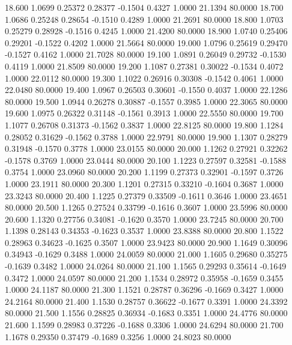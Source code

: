   18.600   1.0699   0.25372   0.28377  -0.1504   0.4327   1.0000  21.1394  80.0000
  18.700   1.0686   0.25248   0.28654  -0.1510   0.4289   1.0000  21.2691  80.0000
  18.800   1.0703   0.25279   0.28928  -0.1516   0.4245   1.0000  21.4200  80.0000
  18.900   1.0740   0.25406   0.29201  -0.1522   0.4202   1.0000  21.5664  80.0000
  19.000   1.0796   0.25619   0.29470  -0.1527   0.4162   1.0000  21.7028  80.0000
  19.100   1.0891   0.26049   0.29732  -0.1530   0.4119   1.0000  21.8509  80.0000
  19.200   1.1087   0.27381   0.30022  -0.1534   0.4072   1.0000  22.0112  80.0000
  19.300   1.1022   0.26916   0.30308  -0.1542   0.4061   1.0000  22.0480  80.0000
  19.400   1.0967   0.26503   0.30601  -0.1550   0.4037   1.0000  22.1286  80.0000
  19.500   1.0944   0.26278   0.30887  -0.1557   0.3985   1.0000  22.3065  80.0000
  19.600   1.0975   0.26322   0.31148  -0.1561   0.3913   1.0000  22.5550  80.0000
  19.700   1.1077   0.26708   0.31373  -0.1562   0.3837   1.0000  22.8125  80.0000
  19.800   1.1284   0.28052   0.31629  -0.1562   0.3788   1.0000  22.9791  80.0000
  19.900   1.1307   0.28279   0.31948  -0.1570   0.3778   1.0000  23.0155  80.0000
  20.000   1.1262   0.27921   0.32262  -0.1578   0.3769   1.0000  23.0444  80.0000
  20.100   1.1223   0.27597   0.32581  -0.1588   0.3754   1.0000  23.0960  80.0000
  20.200   1.1199   0.27373   0.32901  -0.1597   0.3726   1.0000  23.1911  80.0000
  20.300   1.1201   0.27315   0.33210  -0.1604   0.3687   1.0000  23.3243  80.0000
  20.400   1.1225   0.27379   0.33509  -0.1611   0.3646   1.0000  23.4651  80.0000
  20.500   1.1265   0.27524   0.33799  -0.1616   0.3607   1.0000  23.5996  80.0000
  20.600   1.1320   0.27756   0.34081  -0.1620   0.3570   1.0000  23.7245  80.0000
  20.700   1.1398   0.28143   0.34353  -0.1623   0.3537   1.0000  23.8388  80.0000
  20.800   1.1522   0.28963   0.34623  -0.1625   0.3507   1.0000  23.9423  80.0000
  20.900   1.1649   0.30096   0.34943  -0.1629   0.3488   1.0000  24.0059  80.0000
  21.000   1.1605   0.29680   0.35275  -0.1639   0.3482   1.0000  24.0264  80.0000
  21.100   1.1565   0.29293   0.35614  -0.1649   0.3472   1.0000  24.0597  80.0000
  21.200   1.1534   0.28972   0.35958  -0.1659   0.3455   1.0000  24.1187  80.0000
  21.300   1.1521   0.28787   0.36296  -0.1669   0.3427   1.0000  24.2164  80.0000
  21.400   1.1530   0.28757   0.36622  -0.1677   0.3391   1.0000  24.3392  80.0000
  21.500   1.1556   0.28825   0.36934  -0.1683   0.3351   1.0000  24.4776  80.0000
  21.600   1.1599   0.28983   0.37226  -0.1688   0.3306   1.0000  24.6294  80.0000
  21.700   1.1678   0.29350   0.37479  -0.1689   0.3256   1.0000  24.8023  80.0000
